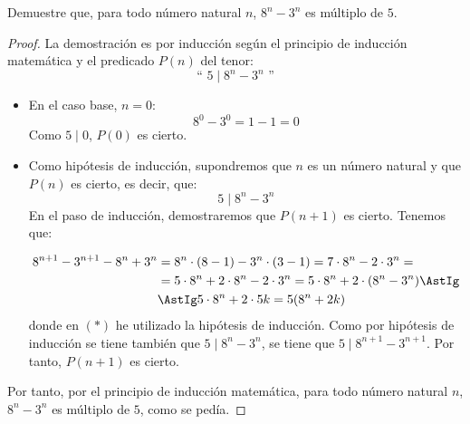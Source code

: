 \begin{ejercicio}
    Demuestre que, para todo número natural $n$, $8^n - 3^n$ es múltiplo de $5$.

    \begin{proof}
        La demostración es por inducción según el principio de inducción matemática y el predicado $P(n)$ del tenor:
        \begin{equation*}
            \text{`` }5 \mid 8^n - 3^n\text{ ''}
        \end{equation*}

        \begin{itemize}
            \item En el caso base, $n=0$:
                \begin{equation*}
                    8^0 - 3^0 = 1-1 = 0
                \end{equation*}
                Como $5\mid 0$, $P(0)$ es cierto.

            \item Como hipótesis de inducción, supondremos que $n$ es un número natural y que $P(n)$ es cierto, es decir, que:
                \begin{equation*}
                    5\mid 8^n - 3^n
                \end{equation*}
                En el paso de inducción, demostraremos que $P(n+1)$ es cierto. Tenemos que:
                
                \begin{align*}
                    8^{n+1}-3^{n+1} - 8^n + 3^n &= 8^n\cdot (8-1) -3^n\cdot (3-1) = 7\cdot 8^n - 2\cdot 3^n =\\
                    &= 5\cdot 8^n + 2\cdot 8^n - 2\cdot 3^n = 5\cdot 8^n + 2\cdot (8^n - 3^n) \AstIg\\
                    &\AstIg 5\cdot 8^n + 2\cdot 5k = 5(8^n + 2k)
                \end{align*}
                donde en $(\ast)$ he utilizado la hipótesis de inducción.
                Como por hipótesis de inducción se tiene también que $5\mid 8^n - 3^n$, se tiene que $5\mid 8^{n+1} - 3^{n+1}$.
                Por tanto, $P(n+1)$ es cierto.
        \end{itemize}
        Por tanto, por el principio de inducción matemática, para todo número natural $n$, $8^n - 3^n$ es múltiplo de $5$, como se pedía.
    \end{proof}
\end{ejercicio}


